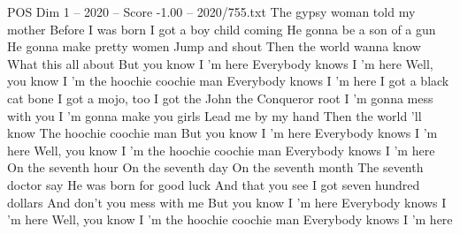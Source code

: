 \begin{textsample}{POS Dim 1 – 2020 – Score -1.00 – 2020/755.txt}  \label{ex:f1_pos_019}
The gypsy woman told my mother Before I was born I got a boy child coming He gonna be a son of a gun He gonna make pretty women Jump and shout Then the world wanna know What this all about But you know I 'm here Everybody knows I 'm here Well, you know I 'm the hoochie coochie man Everybody knows I 'm here I got a black cat bone I got a mojo, too I got the John the Conqueror root I 'm gonna mess with you I 'm gonna make you girls Lead me by my hand Then the world 'll know The hoochie coochie man But you know I 'm here Everybody knows I 'm here Well, you know I 'm the hoochie coochie man Everybody knows I 'm here On the seventh hour On the seventh day On the seventh month The seventh doctor say He was born for good luck And that you see I got seven hundred dollars And don't you mess with me But you know I 'm here Everybody knows I 'm here Well, you know I 'm the hoochie coochie man Everybody knows I 'm here

\end{textsample}
